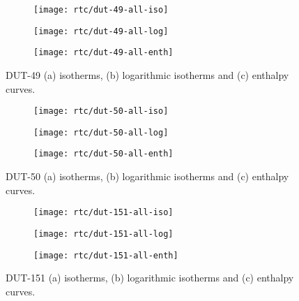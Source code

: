 \begin{figure}[H]
    \centering
    \begin{subfigure}{0.33\linewidth}
        \texttt{[image: rtc/dut-49-all-iso]}%
        \caption{}
    \end{subfigure}%
    \begin{subfigure}{0.33\linewidth}
        \texttt{[image: rtc/dut-49-all-log]}%
        \caption{}
    \end{subfigure}%
    \begin{subfigure}{0.33\linewidth}
        \texttt{[image: rtc/dut-49-all-enth]}%
        \caption{}
    \end{subfigure}%
    \caption{DUT-49 (a) isotherms, (b) logarithmic isotherms and 
    (c) enthalpy curves.}%
    \label{appx:dut:fig:dut-49-butane-rtc}
\end{figure}

\begin{figure}[H]
    \centering
    \begin{subfigure}{0.33\linewidth}
        \texttt{[image: rtc/dut-50-all-iso]}%
        \caption{}
    \end{subfigure}%
    \begin{subfigure}{0.33\linewidth}
        \texttt{[image: rtc/dut-50-all-log]}%
        \caption{}
    \end{subfigure}%
    \begin{subfigure}{0.33\linewidth}
        \texttt{[image: rtc/dut-50-all-enth]}%
        \caption{}
    \end{subfigure}%
    \caption{DUT-50 (a) isotherms, (b) logarithmic isotherms and 
    (c) enthalpy curves.}%
    \label{appx:dut:fig:dut-50-butane-rtc}
\end{figure}

\begin{figure}[H]
    \centering
    \begin{subfigure}{0.33\linewidth}
        \texttt{[image: rtc/dut-151-all-iso]}%
        \caption{}
    \end{subfigure}%
    \begin{subfigure}{0.33\linewidth}
        \texttt{[image: rtc/dut-151-all-log]}%
        \caption{}
    \end{subfigure}%
    \begin{subfigure}{0.33\linewidth}
        \texttt{[image: rtc/dut-151-all-enth]}%
        \caption{}
    \end{subfigure}%
    \caption{DUT-151 (a) isotherms, (b) logarithmic isotherms and 
    (c) enthalpy curves.}%
    \label{appx:dut:fig:dut-151-butane-rtc}
\end{figure}

